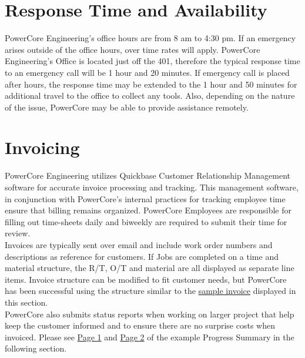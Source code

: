 \pagebreak

\section{Response Time and Availability}
\label{RTA}

PowerCore Engineering's office hours are from 8 am to 4:30 pm.  If an emergency arises outside of the office hours, over time rates will apply.  PowerCore Engineering's Office is located just off the 401, therefore the typical response time to an emergency call will be 1 hour and 20 minutes.  If emergency call is placed after hours, the response time may be extended to the 1 hour and 50 minutes for additional travel to the office to collect any tools.  Also, depending on the nature of the issue, PowerCore may be able to provide assistance remotely.  

\pagebreak

\section{Invoicing}
\label{Inv}

PowerCore Engineering utilizes Quickbase Customer Relationship Management software for accurate invoice processing and tracking.  This management software, in conjunction with PowerCore's internal practices for tracking employee time ensure that billing remains organized.  PowerCore Employees are responsible for filling out time-sheets daily and biweekly are required to submit their time for review.\\

Invoices are typically sent over email and include work order numbers and descriptions as reference for customers.  If Jobs are completed on a time and material structure, the R/T, O/T and material are all displayed as separate line items.  Invoice structure can be modified to fit customer needs, but PowerCore has been successful using the structure similar to the \hyperref[fig:Ir5000]{sample invoice} displayed in this section.\\

PowerCore also submits status reports when working on larger project that help keep the customer informed and to ensure there are no surprise costs when invoiced. Please see  \hyperref[fig:Page1OfProgressReport]{Page 1} and \hyperref[fig:Page2OfProgressReport]{Page 2} of the example Progress Summary in the following section.\\

